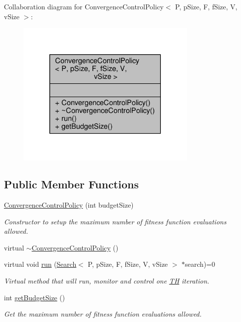Collaboration diagram for Convergence\+Control\+Policy$<$ P, p\+Size, F, f\+Size, V, v\+Size $>$\+:\nopagebreak
\begin{figure}[H]
\begin{center}
\leavevmode
\includegraphics[width=249pt]{classConvergenceControlPolicy__coll__graph}
\end{center}
\end{figure}
\subsection*{Public Member Functions}
\begin{DoxyCompactItemize}
\item 
\hyperlink{classConvergenceControlPolicy_a8882660f0bfd404494339aed74d625a2}{Convergence\+Control\+Policy} (int budget\+Size)
\begin{DoxyCompactList}\small\item\em Constructor to setup the maximum number of fitness function evaluations allowed. \end{DoxyCompactList}\item 
virtual \hyperlink{classConvergenceControlPolicy_a1827a6722494ff97719a2383976e9c11}{$\sim$\+Convergence\+Control\+Policy} ()
\item 
virtual void \hyperlink{classConvergenceControlPolicy_ad72beb5807e87c3fa0602bd0bf4679ac}{run} (\hyperlink{classSearch}{Search}$<$ P, p\+Size, F, f\+Size, V, v\+Size $>$ $\ast$search)=0
\begin{DoxyCompactList}\small\item\em Virtual method that will run, monitor and control one \hyperlink{classTH}{TH} iteration. \end{DoxyCompactList}\item 
int \hyperlink{classConvergenceControlPolicy_a445c537935922b1bcb67d3732abbfe0f}{get\+Budget\+Size} ()
\begin{DoxyCompactList}\small\item\em Get the maximum number of fitness function evaluations allowed. \end{DoxyCompactList}\end{DoxyCompactItemize}


